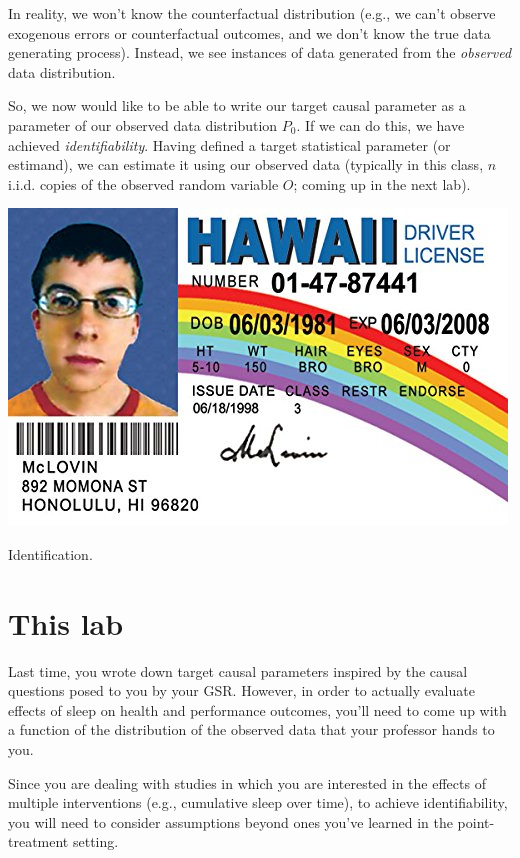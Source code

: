 \documentclass{exam}
\newenvironment{myfigure}{\captionsetup{type=mytype}}{}
\begin{document}
\noindent In reality, we won't know the counterfactual distribution (e.g., we can't observe exogenous errors or counterfactual outcomes, and we don't know the true data generating process). Instead, we see instances of data generated from the \textit{observed} data distribution.

\noindent So, we now would like to be able to write our target causal parameter as a parameter of our observed data distribution $P_0$. If we can do this, we have achieved \textit{identifiability}. Having defined a target statistical parameter (or estimand), we can estimate it using our observed data (typically in this class, $n$ i.i.d. copies of the observed random variable $O$; coming up in the next lab).

\begin{myfigure}
\begin{center}
\includegraphics[width=.3\textwidth]{identification.jpg}
\caption{Identification.}
\end{center}
\end{myfigure}

\section{This lab}

Last time, you wrote down target causal parameters inspired by the causal questions posed to you by your GSR. However, in order to actually evaluate effects of sleep on health and performance outcomes, you'll need to come up with a function of the distribution of the observed data that your professor hands to you. 


\noindent Since you are dealing with studies in which you are interested in the effects of multiple interventions (e.g., cumulative sleep over time), to achieve identifiability, you will need to consider assumptions beyond ones you've learned in the point-treatment setting. 
\end{document}
